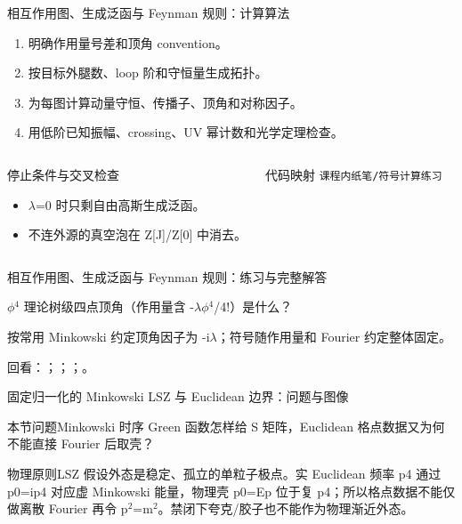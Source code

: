 \begin{frame}[t]{相互作用图、生成泛函与 Feynman 规则：计算算法}
\footnotesize
{}\begin{enumerate}
\item 明确作用量号差和顶角 convention。
\item 按目标外腿数、loop 阶和守恒量生成拓扑。
\item 为每图计算动量守恒、传播子、顶角和对称因子。
\item 用低阶已知振幅、crossing、UV 幂计数和光学定理检查。
\end{enumerate}\begin{columns}[T,onlytextwidth]
\begin{block}{停止条件与交叉检查}\scriptsize\begin{itemize}
\item[\CheckMark] \ensuremath{\lambda}=0 时只剩自由高斯生成泛函。
\item[\CheckMark] 不连外源的真空泡在 Z[J]/\allowbreak{}Z[0] 中消去。
\end{itemize}\end{block}
\begin{block}{代码映射}
\scriptsize \texttt{课程内纸笔/\allowbreak{}符号计算练习}
\end{block}\end{columns}\end{frame}

\begin{frame}[t]{相互作用图、生成泛函与 Feynman 规则：练习与完整解答}
\footnotesize
\begin{block}{}\ensuremath{\phi}\ensuremath{^{4}} 理论树级四点顶角（作用量含 -\ensuremath{\lambda}\ensuremath{\phi}\ensuremath{^{4}}/\allowbreak{}4!）是什么？\end{block}
\begin{exampleblock}{}按常用 Minkowski 约定顶角因子为 -i\ensuremath{\lambda}；符号随作用量和 Fourier 约定整体固定。\end{exampleblock}
\vfill
\scriptsize 回看：；；；。
\end{frame}

\begin{frame}[t]{固定归一化的 Minkowski LSZ 与 Euclidean 边界：问题与图像}
\footnotesize
\begin{block}{本节问题}Minkowski 时序 Green 函数怎样给 S 矩阵，Euclidean 格点数据又为何不能直接 Fourier 后取壳？\end{block}
\begin{block}{物理原则}\quad LSZ 假设外态是稳定、孤立的单粒子极点。实 Euclidean 频率 p4 通过 p0=ip4 对应虚 Minkowski 能量，物理壳 p0=Ep 位于复 p4；所以格点数据不能仅做离散 Fourier 再令 p\ensuremath{^{2}}=m\ensuremath{^{2}}。禁闭下夸克/\allowbreak{}胶子也不能作为物理渐近外态。\end{block}
\end{frame}

